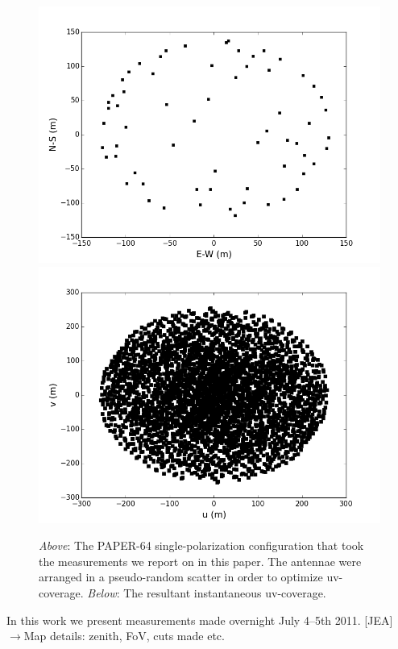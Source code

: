 \documentclass[preprint2,epsf,epsfig,graphics]{emulateapj}
\begin{document}
\begin{figure}
\includegraphics[width=\columnwidth]{psa64imageconfig.png}
\includegraphics[width=\columnwidth]{psa64uvcoverage.png}
\caption{\textit{Above}: The PAPER-64 single-polarization configuration that took the measurements we report on in this paper. The antennae were arranged in a pseudo-random scatter in order to optimize uv-coverage. \textit{Below}: The resultant instantaneous uv-coverage.}
\label{fig:config}
\end{figure}

In this work we present measurements made overnight July 4--5th 2011.
{\color{blue}[JEA] $\rightarrow$}Map details: zenith, FoV, cuts made etc.
\end{document}
